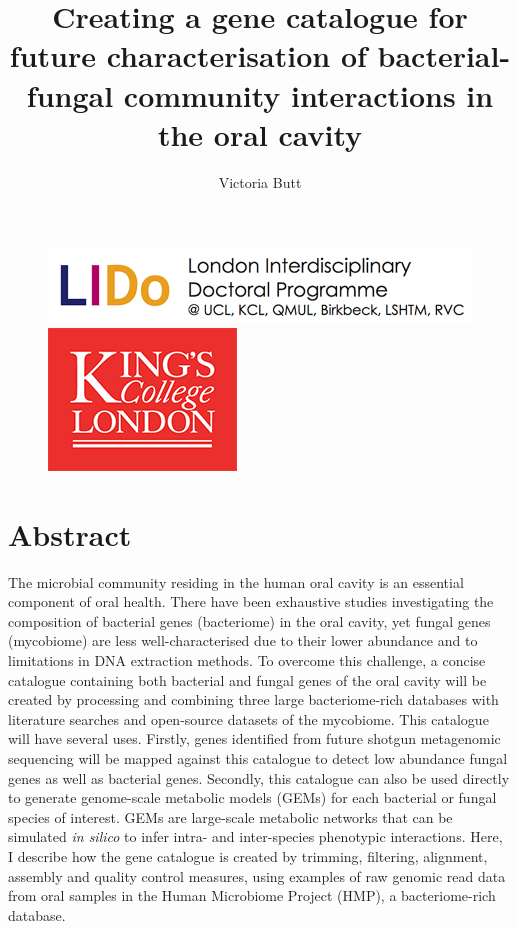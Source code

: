 \documentclass[a4paper]{article}
\date{}
\title{Creating a gene catalogue for future characterisation of bacterial-fungal community interactions in the oral cavity}
\author{Victoria Butt}
\begin{document}

\begin{figure}[t]
\centering
\includegraphics[width=0.7\linewidth,valign=t]{logo.png}
\includegraphics[width=0.2\linewidth,valign=t]{kcl-logo.jpg}
\end{figure}

\maketitle

\newpage
\section{Abstract}
The microbial community residing in the human oral cavity is an essential component of oral health. There have been exhaustive studies investigating the composition of bacterial genes (bacteriome) in the oral cavity, yet fungal genes (mycobiome) are less well-characterised due to their lower abundance and to limitations in DNA extraction methods. To overcome this challenge, a concise catalogue containing both bacterial and fungal genes of the oral cavity will be created by processing and combining three large bacteriome-rich databases with literature searches and open-source datasets of the mycobiome. This catalogue will have several uses. Firstly, genes identified from future shotgun metagenomic sequencing will be mapped against this catalogue to detect low abundance fungal genes as well as bacterial genes. Secondly, this catalogue can also be used directly to generate genome-scale metabolic models (GEMs) for each bacterial or fungal species of interest. GEMs are large-scale metabolic networks that can be simulated \textit{in silico} to infer intra- and inter-species phenotypic interactions. Here, I describe how the gene catalogue is created by trimming, filtering, alignment, assembly and quality control measures, using examples of raw genomic read data from oral samples in the Human Microbiome Project (HMP), a bacteriome-rich database.
\end{document}
